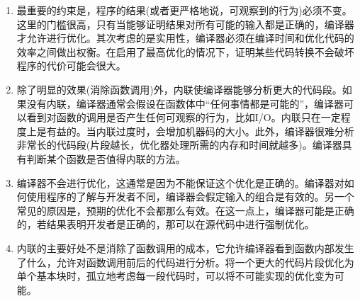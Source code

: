 \begin{enumerate}
\item 
最重要的约束是，程序的结果(或者更严格地说，可观察到的行为)必须不变。这里的门槛很高，只有当能够证明结果对所有可能的输入都是正确的，编译器才允许进行优化。其次考虑的是实用性，编译器必须在编译时间和优化代码的效率之间做出权衡。在启用了最高优化的情况下，证明某些代码转换不会破坏程序的代价可能会很大。 

\item 
除了明显的效果(消除函数调用)外，内联使编译器能够分析更大的代码段。如果没有内联，编译器通常会假设在函数体中“任何事情都是可能的”，编译器可以看到对函数的调用是否产生任何可观察的行为，比如I/O。内联只在一定程度上是有益的。当内联过度时，会增加机器码的大小。此外，编译器很难分析非常长的代码段(片段越长，优化器处理所需的内存和时间就越多)。编译器具有判断某个函数是否值得内联的方法。

\item 
编译器不会进行优化，这通常是因为不能保证这个优化是正确的。编译器对如何使用程序的了解与开发者不同，编译器会假定输入的组合是有效的。另一个常见的原因是，预期的优化不会都那么有效。在这一点上，编译器可能是正确的，若结果表明开发者是正确的，那可以在源代码中进行强制优化。

\item
内联的主要好处不是消除了函数调用的成本，它允许编译器看到函数内部发生了什么，允许对函数调用前后的代码进行分析。将一个更大的代码片段优化为单个基本块时，孤立地考虑每一段代码时，可以将不可能实现的优化变为可能。

\end{enumerate}
